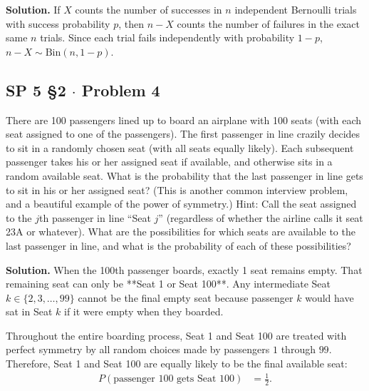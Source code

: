 \documentclass[11pt,a4paper]{article}
\begin{document}
\noindent \textbf{Solution.} If $X$ counts the number of successes in $n$ independent Bernoulli trials with success probability $p$, then $n - X$ counts the number of failures in the exact same $n$ trials. Since each trial fails independently with probability $1 - p$, $n - X \sim \text{Bin}(n, 1-p)$.

\vspace{10pt}
\subsection{SP 5 \S2 $\cdot$ Problem 4}
\begin{tcolorbox}[title={SP 5 \S2 $\cdot$ Problem 4}]
There are 100 passengers lined up to board an airplane with 100 seats (with each seat assigned to one of the passengers). The first passenger in line crazily decides to sit in a randomly chosen seat (with all seats equally likely). Each subsequent passenger takes his or her assigned seat if available, and otherwise sits in a random available seat. What is the probability that the last passenger in line gets to sit in his or her assigned seat? (This is another common interview problem, and a beautiful example of the power of symmetry.)
Hint: Call the seat assigned to the $j$th passenger in line ``Seat $j$'' (regardless of whether the airline calls it seat 23A or whatever). What are the possibilities for which seats are available to the last passenger in line, and what is the probability of each of these possibilities?
\end{tcolorbox}

\noindent \textbf{Solution.} When the 100th passenger boards, exactly 1 seat remains empty. That remaining seat can only be **Seat 1 or Seat 100**. Any intermediate Seat $k \in \{2, 3, \dots, 99\}$ cannot be the final empty seat because passenger $k$ would have sat in Seat $k$ if it were empty when they boarded.

Throughout the entire boarding process, Seat 1 and Seat 100 are treated with perfect symmetry by all random choices made by passengers $1$ through $99$. Therefore, Seat 1 and Seat 100 are equally likely to be the final available seat:
\begin{align*}
P(\text{passenger 100 gets Seat 100}) &= \frac{1}{2}.
\end{align*}

\vspace{10pt}
\end{document}
